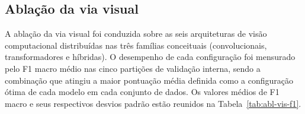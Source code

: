 \begin{table}[htb]
\centering
\caption{Configurações ótimas de hiperparâmetros e desempenhos dos codificadores selecionados na via topológica por conjunto de dados.}
\label{tab:abl-top-melhores}
\small
{}
\end{table}

\subsection{Ablação da via visual}
\label{sec:ablacao-visual}

A ablação da via visual foi conduzida sobre as seis arquiteturas de visão computacional distribuídas nas três famílias conceituais (convolucionais, transformadores e híbridas). O desempenho de cada configuração foi mensurado pelo F1 macro médio nas cinco partições de validação interna, sendo a combinação que atingiu a maior pontuação média definida como a configuração ótima de cada modelo em cada conjunto de dados. Os valores médios de F1 macro e seus respectivos desvios padrão estão reunidos na Tabela~\ref{tab:abl-vis-f1}.

